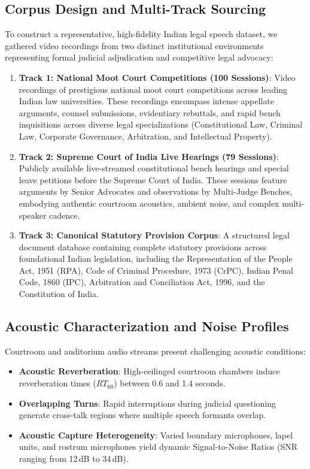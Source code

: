 \documentclass{llncs}
\begin{document}
\subsection{Corpus Design and Multi-Track Sourcing}
To construct a representative, high-fidelity Indian legal speech dataset, we gathered video recordings from two distinct institutional environments representing formal judicial adjudication and competitive legal advocacy:

\begin{enumerate}
    \item \textbf{Track 1: National Moot Court Competitions (100 Sessions)}: Video recordings of prestigious national moot court competitions across leading Indian law universities. These recordings encompass intense appellate arguments, counsel submissions, evidentiary rebuttals, and rapid bench inquisitions across diverse legal specializations (Constitutional Law, Criminal Law, Corporate Governance, Arbitration, and Intellectual Property).
    \item \textbf{Track 2: Supreme Court of India Live Hearings (79 Sessions)}: Publicly available live-streamed constitutional bench hearings and special leave petitions before the Supreme Court of India. These sessions feature arguments by Senior Advocates and observations by Multi-Judge Benches, embodying authentic courtroom acoustics, ambient noise, and complex multi-speaker cadence.
    \item \textbf{Track 3: Canonical Statutory Provision Corpus}: A structured legal document database containing complete statutory provisions across foundational Indian legislation, including the Representation of the People Act, 1951 (RPA), Code of Criminal Procedure, 1973 (CrPC), Indian Penal Code, 1860 (IPC), Arbitration and Conciliation Act, 1996, and the Constitution of India.
\end{enumerate}

\subsection{Acoustic Characterization and Noise Profiles}
Courtroom and auditorium audio streams present challenging acoustic conditions:
\begin{itemize}
    \item \textbf{Acoustic Reverberation}: High-ceilinged courtroom chambers induce reverberation times ($RT_{60}$) between 0.6 and 1.4 seconds.
    \item \textbf{Overlapping Turns}: Rapid interruptions during judicial questioning generate cross-talk regions where multiple speech formants overlap.
    \item \textbf{Acoustic Capture Heterogeneity}: Varied boundary microphones, lapel units, and rostrum microphones yield dynamic Signal-to-Noise Ratios (SNR ranging from 12\,dB to 34\,dB).
\end{itemize}
\end{document}
